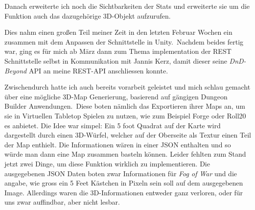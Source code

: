 \documentclass[11pt]{article}
\begin{document}
    Danach erweiterte ich noch die Sichtbarkeiten der Stats und erweiterte sie um die Funktion auch das dazugehörige 3D-Objekt
    aufzurufen.

    Dies nahm einen großen Teil meiner Zeit in den letzten Februar Wochen ein zusammen mit dem Anpassen der Schnittstelle
    in Unity.\ Nachdem beides fertig war, ging es für mich ab März dann zum Thema implementation der REST Schnittstelle
    selbst in Kommunikation mit Jannis Kerz, damit dieser seine \textit{DnD-Beyond} API an meine REST-API anschliessen
    konnte.

    Zwischendurch hatte ich auch bereits vorarbeit geleistet und mich schlau gemacht über eine mögliche 3D-Map Generierung,
    basierend auf gängigen Dungeon Builder Anwendungen.\ Diese boten nämlich das Exportieren ihrer Maps an, um sie in
    Virtuellen Tabletop Spielen zu nutzen, wie zum Beispiel Forge oder Roll20 es anbietet.
    Die Idee war simpel: Ein 5 foot Quadrat auf der Karte wird dargestellt durch einen 3D-Würfel, welcher auf der
    Oberseite als Textur einen Teil der Map enthielt.
    Die Informationen wären in einer JSON enthalten und so würde man dann eine Map zusammen basteln können.
    Leider fehlten zum Stand jetzt zwei Dinge, um diese Funktion wirklich zu implementieren.
    Die ausgegebenen JSON Daten boten zwar Informationen für \textit{Fog of War} und die angabe, wie gross ein 5 Feet
    Kästchen in Pixeln sein soll auf dem ausgegebenen Image.
    Allerdings waren die 3D-Informationen entweder ganz verloren, oder für uns zwar auffindbar, aber nicht lesbar.
\end{document}
